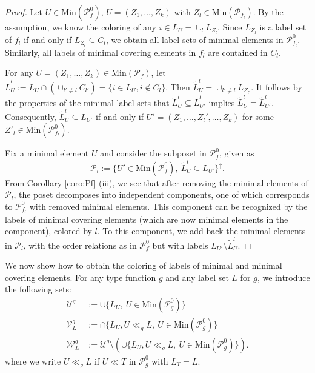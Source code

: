 \documentclass[12pt]{article}
\theoremstyle{definition}
\theoremstyle{remark}
\def\cover{\ll}
\def\Pe{\mathcal P}
\begin{document}
\begin{proof}
Let  $U\in \mathrm{Min}(\Pe_f^0)$,  $U=(Z_1,\dots, Z_k)$ with
  $Z_l\in \mathrm{Min}(\Pe_{f_l})$. By the assumption, we know the coloring of any $i\in
  L_U=\cup_l L_{Z_l}$. Since $L_{Z_l}$ is a label set of $f_l$ if and only if
  $L_{Z_l}\subseteq C_l$, we obtain all label sets of minimal elements in $\Pe_{f_l}^0$.
  Similarly, all labels of minimal covering elements in $f_l$ are contained in  $C_l$.

For any   $U=(Z_1,\dots,Z_k)\in \mathrm{Min}(\Pe_f)$, let $\tilde L_U^l:=L_U\cap
(\cup_{l'\ne l}C_{l'})=\{i\in L_U, i\notin C_l\}$. Then $\tilde L^l_U=\cup_{l'\ne l}
L_{Z_{l'}}$. It follows by the properties of the minimal label sets that $\tilde
L^l_U\subseteq \tilde L^l_{U'}$ implies $\tilde L^l_U=\tilde L_{U'}^l$. Consequently,
$\tilde L^l_U\subseteq L_{U'}$ if and only if 
$U'=(Z_1,\dots,Z_l',\dots,Z_k)$ for some $Z'_l\in \mathrm{Min}(\Pe_{f_l}^0)$. 

Fix a minimal element $U$ and consider the subposet in $\Pe_f^0$, given as
\[
\Pe_l:=\{U'\in \mathrm{Min}(\Pe_f^0),\ \tilde L^l_U\subseteq L_{U'}\}^\uparrow.
\]
From Corollary
\ref{coro:Pf} (iii), we see that after removing the minimal elements of $\Pe_l$, the poset
decomposes into independent components, one of which corresponds to $\Pe_{f_l}^0$ with
removed minimal elements. This component can be recognized by the labels of minimal
covering elements (which are now minimal elements in the component), colored by $l$. 
To this component, we add back the minimal elements in $\Pe_l$, with the order relations
as in $\Pe_f^0$ but with labels $L_{U'}\setminus \tilde L_U^l$. 


\end{proof}

We now show how to obtain the coloring of labels of minimal and minimal covering elements.
For any type function $g$ and any label set $L$ for $g$, we introduce the following sets:
\begin{align*}
\mathcal U^g&:=\cup\{L_U,\ U\in \mathrm{Min}(\Pe_g^0)\}\\
\mathcal V_L^g&:=\cap \{L_U, U\cover_g L,\ U\in \mathrm{Min}(\Pe_g^0)\}\\
\mathcal W_L^g&:=\mathcal U^g\setminus (\cup\{L_U, U\cover_g L,\ U\in
\mathrm{Min}(\Pe_g^0) \}).
\end{align*}
where we write $U\cover_g L$ if $U\cover T$ in $\mathcal P_g^0$ with $L_T=L$.
\end{document}
